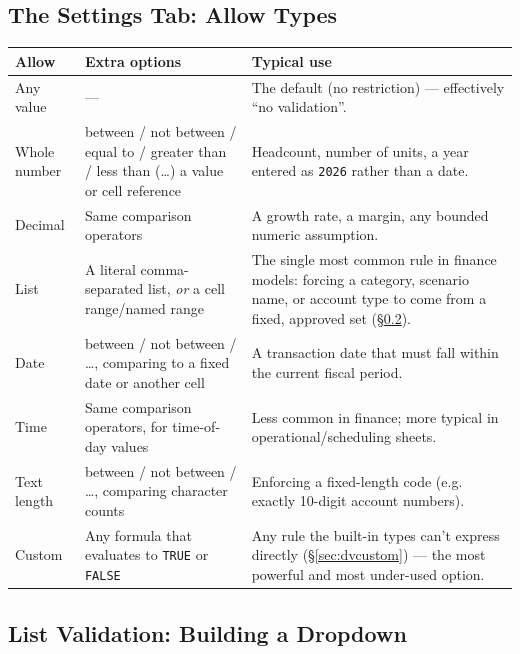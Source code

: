 \documentclass[11pt,a4paper]{article}
\begin{document}
\subsection{The Settings Tab: Allow Types}

\begin{center}
\begin{tabular}{@{}L{2.6cm}L{4.0cm}L{5.2cm}@{}}
\toprule
\textbf{Allow} & \textbf{Extra options} & \textbf{Typical use} \\
\midrule
Any value & --- & The default (no restriction) --- effectively ``no validation''. \\
Whole number & between / not between / equal to / greater than / less than (\ldots) a value or cell reference & Headcount, number of units, a year entered as \texttt{2026} rather than a date. \\
Decimal & Same comparison operators & A growth rate, a margin, any bounded numeric assumption. \\
List & A literal comma-separated list, \emph{or} a cell range/named range & The single most common rule in finance models: forcing a category, scenario name, or account type to come from a fixed, approved set (\S\ref{sec:dvlist}). \\
Date & between / not between / \ldots, comparing to a fixed date or another cell & A transaction date that must fall within the current fiscal period. \\
Time & Same comparison operators, for time-of-day values & Less common in finance; more typical in operational/scheduling sheets. \\
Text length & between / not between / \ldots, comparing character counts & Enforcing a fixed-length code (e.g. exactly 10-digit account numbers). \\
Custom & Any formula that evaluates to \texttt{TRUE} or \texttt{FALSE} & Any rule the built-in types can't express directly (\S\ref{sec:dvcustom}) --- the most powerful and most under-used option. \\
\bottomrule
\end{tabular}
\end{center}

\subsection{List Validation: Building a Dropdown}
\label{sec:dvlist}
\end{document}
